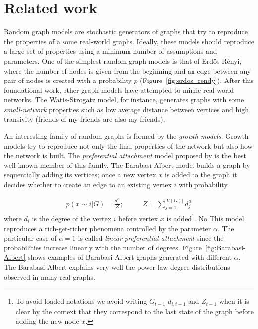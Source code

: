 \documentclass[smallextended]{svjour3}          %
\begin{document}
\section{Related work}\label{sec:related-work}
Random graph models are stochastic generators of graphs that try to reproduce the properties of a some real-world graphs. Ideally, these models should reproduce a large set of properties using a minimum number of assumptions and parameters.
One of the simplest random graph models is that of Erdös-Rényi, where the number of nodes is given from the beginning and an edge between any pair of nodes is created with a probability $p$  (Figure~\ref{fig:erdos_rendy}). After this foundational work, other graph models have attempted to mimic real-world networks. The Watts-Strogatz model, for instance, generates graphs with some \textit{small-network} properties such as low average distance between vertices and high transivity (friends of my friends are also my friends).

An interesting family of random graphs is formed by the \textit{growth models}. Growth models try to reproduce not only the final properties of the network but also how the network is built. The \textit{preferential attachment} model proposed by \cite{Barabasi1999} is the best well-known member of this family.
The Barabasi-Albert model builds a graph by sequentially adding its vertices; once a new vertex $x$ is added to the graph it decides whether to create an edge to an existing vertex $i$ with probability

\begin{align}
	p(x \sim i | G) =\frac{d_{i}^\alpha}{Z}; &\qquad
	Z = \sum_{j=1}^{|V(G)|} d_j^\alpha
\end{align}
where $d_i$ is the degree of the vertex $i$ before vertex $x$ is added\footnote{To avoid loaded notations we avoid writing $G_{t-1}$ $d_{i,t-1}$ and $Z_{t-1}$ when it is clear by the context that they correspond to the last state of the graph before adding the new node $x$.}. No This model reproduces a rich-get-richer phenomena controlled by the parameter $\alpha$. The particular case of $\alpha=1$ is called \textit{linear preferential-attachment} since the probabilities increase linearly with the number of degrees. Figure~\ref{fig:Barabasi-Albert} shows examples of Barabasi-Albert graphs generated with different $\alpha$. The Barabasi-Albert explains very well the power-law degree distributions observed in many real graphs.
\end{document}
